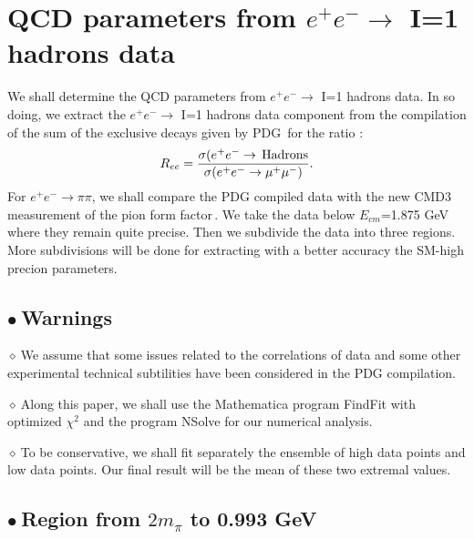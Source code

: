 \documentclass[review]{elsarticle}
\def\beq{\begin{equation}}
\def\eeq{\end{equation}}
\def\b{$\bullet~$}
\def\d{$\diamond~$}
\begin{document}
\section{QCD parameters from $e^+e^-\to$ I=1 hadrons data }
We shall determine the QCD  parameters from $e^+e^-\to$ I=1 hadrons data. In so doing, 
we extract the $e^+e^-\to$ I=1 hadrons data component  from   the compilation of the sum of the exclusive decays given by PDG\,\cite{PDG} for the ratio :
\beq
R_{ee}=\frac{\sigma(e^+e^-\to\,{\rm Hadrons}}{\sigma(e^+e^-\to\mu^+\mu^-)}.
\label{eq:Ree}
\eeq
For $e^+e^-\to \pi\pi$, we shall compare the PDG compiled data with the new CMD3 measurement of the pion form factor\,\cite{CMD3}. We take the data below $E_{cm}$=1.875 GeV where they remain quite precise. Then we subdivide the data into three regions. More subdivisions will be done for extracting with a better accuracy the SM-high precion parameters.
\subsection*{\b Warnings}
\d We assume that some issues related to the correlations of data and some other experimental technical subtilities  have been considered in the PDG compilation. 

\d Along this paper, we shall use the Mathematica program FindFit with optimized $\chi^2$ and the program NSolve for our numerical analysis. 

\d To be conservative, we shall fit separately the ensemble of high data points and low data points. Our final result will be the mean of these two extremal values. 
\subsection*{\b Region from $2m_\pi$ to   0.993 GeV}
\end{document}

